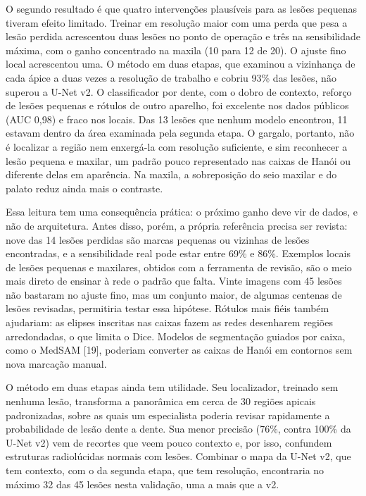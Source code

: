 \documentclass[twocolumn]{article}
\begin{document}
O segundo resultado é que quatro intervenções plausíveis para as lesões pequenas tiveram efeito limitado. Treinar em resolução maior com uma perda que pesa a lesão perdida acrescentou duas lesões no ponto de operação e três na sensibilidade máxima, com o ganho concentrado na maxila (10 para 12 de 20). O ajuste fino local acrescentou uma. O método em duas etapas, que examinou a vizinhança de cada ápice a duas vezes a resolução de trabalho e cobriu 93\% das lesões, não superou a U-Net v2. O classificador por dente, com o dobro de contexto, reforço de lesões pequenas e rótulos de outro aparelho, foi excelente nos dados públicos (AUC 0,98) e fraco nos locais. Das 13 lesões que nenhum modelo encontrou, 11 estavam dentro da área examinada pela segunda etapa. O gargalo, portanto, não é localizar a região nem enxergá-la com resolução suficiente, e sim reconhecer a lesão pequena e maxilar, um padrão pouco representado nas caixas de Hanói ou diferente delas em aparência. Na maxila, a sobreposição do seio maxilar e do palato reduz ainda mais o contraste.

Essa leitura tem uma consequência prática: o próximo ganho deve vir de dados, e não de arquitetura. Antes disso, porém, a própria referência precisa ser revista: nove das 14 lesões perdidas são marcas pequenas ou vizinhas de lesões encontradas, e a sensibilidade real pode estar entre 69\% e 86\%. Exemplos locais de lesões pequenas e maxilares, obtidos com a ferramenta de revisão, são o meio mais direto de ensinar à rede o padrão que falta. Vinte imagens com 45 lesões não bastaram no ajuste fino, mas um conjunto maior, de algumas centenas de lesões revisadas, permitiria testar essa hipótese. Rótulos mais fiéis também ajudariam: as elipses inscritas nas caixas fazem as redes desenharem regiões arredondadas, o que limita o Dice. Modelos de segmentação guiados por caixa, como o MedSAM [19], poderiam converter as caixas de Hanói em contornos sem nova marcação manual.

O método em duas etapas ainda tem utilidade. Seu localizador, treinado sem nenhuma lesão, transforma a panorâmica em cerca de 30 regiões apicais padronizadas, sobre as quais um especialista poderia revisar rapidamente a probabilidade de lesão dente a dente. Sua menor precisão (76\%, contra 100\% da U-Net v2) vem de recortes que veem pouco contexto e, por isso, confundem estruturas radiolúcidas normais com lesões. Combinar o mapa da U-Net v2, que tem contexto, com o da segunda etapa, que tem resolução, encontraria no máximo 32 das 45 lesões nesta validação, uma a mais que a v2.
\end{document}
